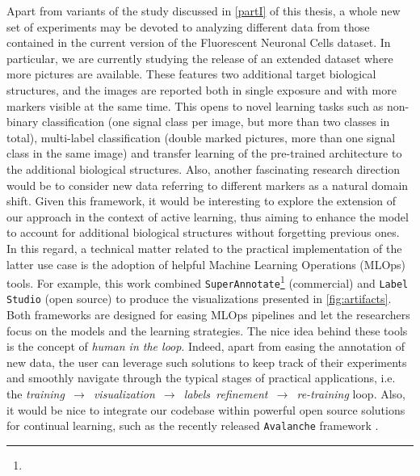 Apart from variants of the study discussed in \cref{partI} of this thesis, a whole new set of experiments may be devoted to analyzing different data from those contained in the current version of the Fluorescent Neuronal Cells dataset.
In particular, we are currently studying the release of an extended dataset where more pictures are available.
These features two additional target biological structures, and the images are reported both in single exposure and with more markers visible at the same time.
This opens to novel learning tasks such as non-binary classification (one signal class per image, but more than two classes in total), multi-label classification (double marked pictures, more than one signal class in the same image) and transfer learning of the pre-trained architecture to the additional biological structures.
Also, another fascinating research direction would be to consider new data referring to different markers as a natural domain shift. Given this framework, it would be interesting to explore the extension of our approach in the context of active learning, thus aiming to enhance the model to account for additional biological structures without forgetting previous ones.
In this regard, a technical matter related to the practical implementation of the latter use case is the adoption of helpful Machine Learning Operations (MLOps) tools.
For example, this work combined \texttt{SuperAnnotate}\footnote{\superannotate} (commercial) and \texttt{Label Studio} (open source) \cite{labelstudio} to produce the visualizations presented in \cref{fig:artifacts}. Both frameworks are designed for easing MLOps pipelines and let the researchers focus on the models and the learning strategies.
The nice idea behind these tools is the concept of \textit{human in the loop}. 
Indeed, apart from easing the annotation of new data, the user can leverage such solutions to keep track of their experiments and smoothly navigate through the typical stages of practical applications, i.e. the \mbox{\textit{training $\longrightarrow$ visualization $\longrightarrow$ labels refinement $\longrightarrow$ re-training}} loop.
Also, it would be nice to integrate our codebase within powerful open source solutions for continual learning, such as the recently released \texttt{Avalanche} framework \cite{lomonaco2021avalanche}.

